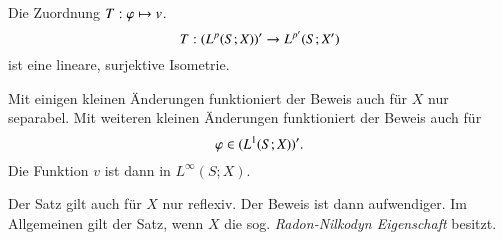 \begin{remark}
    Die Zuordnung $T:\varphi \mapsto v$.
    \[
        T:(L^p(S;X))'\rightarrow L^{p'}(S;X')
    \]
    ist eine lineare, surjektive Isometrie.
\end{remark}

\begin{remark}
    Mit einigen kleinen Änderungen funktioniert der Beweis auch für $X$ nur separabel. Mit weiteren
    kleinen Änderungen funktioniert der Beweis auch für
    \[
        \varphi \in (L^1(S;X))'.
    \]
    Die Funktion $v$ ist dann in $L^\infty(S;X)$.
\end{remark}

\begin{remark}
    Der Satz gilt auch für $X$  nur reflexiv. Der Beweis ist dann aufwendiger. Im Allgemeinen gilt der
    Satz, wenn $X$ die sog. \textit{Radon-Nilkodyn Eigenschaft} besitzt.
\end{remark}
